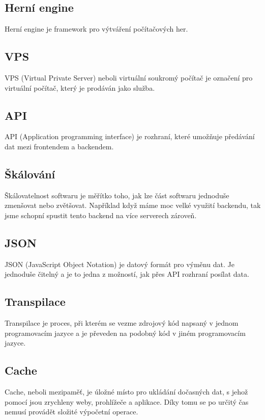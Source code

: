 \subsection{Herní engine}
Herní engine je framework pro výtváření počítačových her.

\subsection{VPS}
VPS (Virtual Private Server) neboli virtuální soukromý počítač je označení pro virtuální počítač, který je prodáván jako služba.

\subsection{API}
API (Application programming interface) je rozhraní, které umožňuje předávání dat mezi frontendem a backendem.

\subsection{Škálování}
Škálovatelnost softwaru je měřítko toho, jak lze část softwaru jednoduše zmenšovat nebo zvětšovat. \cite{Skalovani} Například když máme moc velké využití backendu, tak jsme schopní spustit tento backend na více serverech zároveň.

\subsection{JSON}
JSON (JavaScript Object Notation) je datový formát pro výměnu dat. Je jednoduše čitelný a je to jedna z možností, jak přes API rozhraní posílat data. \cite{JSON}

\subsection{Transpilace}
Transpilace je proces, při kterém se vezme zdrojový kód napsaný v jednom programovacím jazyce a je převeden na podobný kód v jiném programovacím jazyce. \cite{Transpilace}

\subsection{Cache}
Cache, neboli mezipaměť, je úložné místo pro ukládání dočasných dat, s jehož pomocí jsou zrychleny weby, prohlížeče a aplikace. \cite{Cache} Díky tomu se po určitý čas nemusí provádět složité výpočetní operace.

